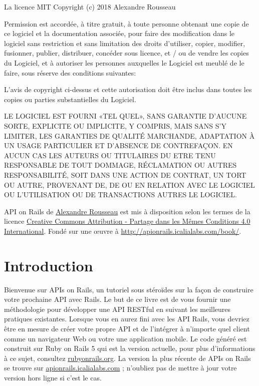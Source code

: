 \documentclass[]{report}
\begin{document}
    \begin{tcolorbox}{La licence MIT}
      Copyright (c) 2018 Alexandre Rousseau

      Permission est accordée, à titre gratuit, à toute personne obtenant une copie de ce logiciel et la documentation associée, pour faire des modification dans le logiciel sans restriction et sans limitation des droits d’utiliser, copier, modifier, fusionner, publier, distribuer, concéder sous licence, et / ou de vendre les copies du Logiciel, et à autoriser les personnes auxquelles le Logiciel est meublé de le faire, sous réserve des conditions suivantes:

      L’avis de copyright ci-dessus et cette autorisation doit être inclus dans toutes les copies ou parties substantielles du Logiciel.

      LE LOGICIEL EST FOURNI «TEL QUEL», SANS GARANTIE D’AUCUNE SORTE, EXPLICITE OU IMPLICITE, Y COMPRIS, MAIS SANS S’Y LIMITER, LES GARANTIES DE QUALITÉ MARCHANDE, ADAPTATION À UN USAGE PARTICULIER ET D’ABSENCE DE CONTREFAÇON. EN AUCUN CAS LES AUTEURS OU TITULAIRES DU ETRE TENU RESPONSABLE DE TOUT DOMMAGE, RÉCLAMATION OU AUTRES RESPONSABILITÉ, SOIT DANS UNE ACTION DE CONTRAT, UN TORT OU AUTRE, PROVENANT DE, DE OU EN RELATION AVEC LE LOGICIEL OU L’UTILISATION OU DE TRANSACTIONS AUTRES LE LOGICIEL.
    \end{tcolorbox}

    API on Rails de \href{https://github.com/madeindjs/api\_on\_rails}{Alexandre Rousseau} est mis à disposition selon les termes de la licence \href{http://creativecommons.org/licenses/by-sa/4.0/}{Creative Commons Attribution - Partage dans les Mêmes Conditions 4.0 International}.
    Fondé sur une œuvre à \url{http://apionrails.icalialabs.com/book/}.

\chapter{Introduction}\label{chapter:1}

  Bienvenue sur APIs on Rails, un tutoriel sous stéroïdes sur la façon de construire votre prochaine API avec Rails. Le but de ce livre est de vous fournir une méthodologie pour développer une API RESTful en suivant les meilleures pratiques existantes. Lorsque vous en aurez fini avec les API Rails, vous devriez être en mesure de créer votre propre API et de l'intégrer à n'importe quel client comme un navigateur Web ou votre une application mobile. Le code généré est construit sur Ruby on Rails 5 qui est la version actuelle, pour plus d'informations à ce sujet, consultez \href{http://rubyonrails.org/}{rubyonrails.org}. La version la plus récente de APIs on Rails se trouve sur \href{https://apionrails.icalialabs.com}{apionrails.icalialabs.com} ; n'oubliez pas de mettre à jour votre version hors ligne si c'est le cas.
\end{document}

